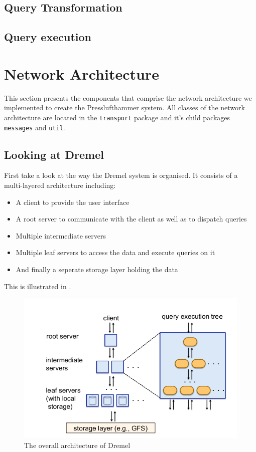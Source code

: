 \subsection{Query Transformation}

\subsection{Query execution}


\section{Network Architecture}
  This section presents the components that comprise the network architecture
  we implemented to create the Presslufthammer system.
  All classes of the network architecture are located in the \texttt{transport}
  package and it's child packages \texttt{messages} and \texttt{util}.
  
  
  \subsection{Looking at Dremel}
    First take a look at the way the Dremel \cite{melnik2010dremel} system is
    organised.
    It consists of a multi-layered architecture including:
    \begin{itemize}
      \item A client to provide the user interface
      \item A root server to communicate with the client as well as to dispatch
        queries
      \item Multiple intermediate servers
      \item Multiple leaf servers to access the data and execute queries on it
      \item And finally a seperate storage layer holding the data
    \end{itemize}
    This is illustrated in .
    \begin{figure}[ht]
      \centering
      \includegraphics[width=.7\textwidth]{images/net-arch}
      \caption{The overall architecture of Dremel\cite{melnik2010dremel}}
      \label{fig:netarch}
    \end{figure}


